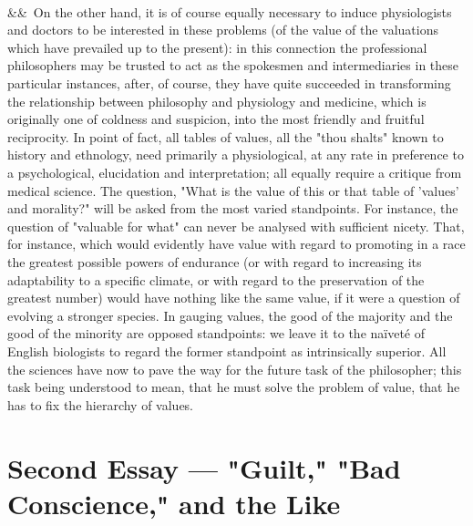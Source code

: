 \documentclass[12pt]{article}
\newcommand{\para}[1][]{\par\noindent\ifx&#1&\else\textsuperscript{\footnotesize #1}~\fi}
\begin{document}
\para On the other hand, it is of course equally necessary to induce physiologists and doctors to be interested in these problems (of the value of the valuations which have prevailed up to the present): in this connection the professional philosophers may be trusted to act as the spokesmen and intermediaries in these particular instances, after, of course, they have quite succeeded in transforming the relationship between philosophy and physiology and medicine, which is originally one of coldness and suspicion, into the most friendly and fruitful reciprocity. In point of fact, all tables of values, all the "thou shalts" known to history and ethnology, need primarily a physiological, at any rate in preference to a psychological, elucidation and interpretation; all equally require a critique from medical science. The question, "What is the value of this or that table of 'values' and morality?" will be asked from the most varied standpoints. For instance, the question of "valuable for what" can never be analysed with sufficient nicety. That, for instance, which would evidently have value with regard to promoting in a race the greatest possible powers of endurance (or with regard to increasing its adaptability to a specific climate, or with regard to the preservation of the greatest number) would have nothing like the same value, if it were a question of evolving a stronger species. In gauging values, the good of the majority and the good of the minority are opposed standpoints: we leave it to the naïveté of English biologists to regard the former standpoint as intrinsically superior. All the sciences have now to pave the way for the future task of the philosopher; this task being understood to mean, that he must solve the problem of value, that he has to fix the hierarchy of values.

\section*{Second Essay --- "Guilt," "Bad Conscience," and the Like}
\end{document}
